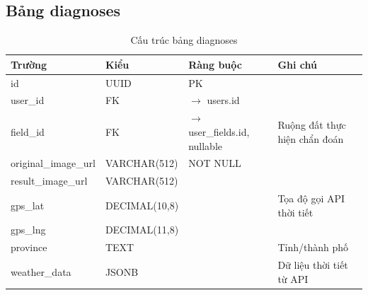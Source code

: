 \documentclass[12pt,a4paper]{article}
\begin{document}
\subsection{Bảng diagnoses}
\begin{longtable}{|l|l|l|p{5.5cm}|}
    \caption{Cấu trúc bảng diagnoses}                                                                                                                             \\
    \hline
    \rowcolor{headerblue}
    \textbf{Trường}      & \textbf{Kiểu}                                                & \textbf{Ràng buộc}                      & \textbf{Ghi chú}              \\
    \hline
    id                   & UUID                                                         & PK                                      &                               \\
    \hline
    user\_id             & FK                                                           & $\rightarrow$ users.id                  &                               \\
    \hline
    field\_id            & FK                                                           & $\rightarrow$ user\_fields.id, nullable & Ruộng đất thực hiện chẩn đoán \\
    \hline
    original\_image\_url & VARCHAR(512)                                                 & NOT NULL                                &                               \\
    \hline
    result\_image\_url   & VARCHAR(512)                                                 &                                         &                               \\
    \hline
    gps\_lat             & DECIMAL(10,8)                                                &                                         & Tọa độ gọi API thời tiết      \\
    \hline
    gps\_lng             & DECIMAL(11,8)                                                &                                         &                               \\
    \hline
    province             & TEXT                                                         &                                         & Tỉnh/thành phố                \\
    \hline
    weather\_data        & JSONB                                                        &                                         & Dữ liệu thời tiết từ API      \\

\end{longtable}
\end{document}
